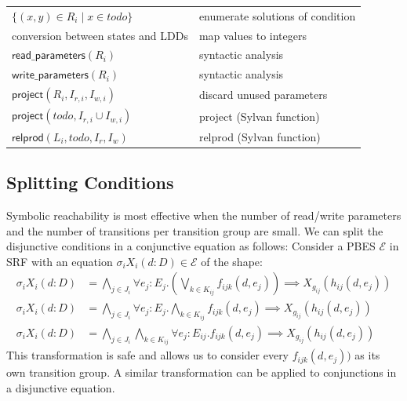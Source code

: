 \documentclass{article}
\newcommand{\var}[1]{\ensuremath{\textit{#1}}}
\begin{document}
\begin{center}
\label{table:pbes_ingredients}
\begin{tabular}{ |l|l| }
\hline
$\{ (x,y) \in R_i \mid x \in todo \}$ & enumerate solutions of condition \\
conversion between states and LDDs & map values to integers \\
$\textsf{read\_parameters}(R_i)$ & syntactic analysis \\
$\textsf{write\_parameters}(R_i)$ & syntactic analysis \\
$\textsf{project}(R_i, I_{r,i}, I_{w,i})$ & discard unused parameters \\
$\textsf{project}(\var{todo}, I_{r,i} \cup I_{w,i})$ & \textsf{project} (Sylvan function) \\
$\textsf{relprod}(L_i, \var{todo}, I_r, I_w)$ & \textsf{relprod} (Sylvan function) \\
\hline
\end{tabular}
\end{center}

\subsection{Splitting Conditions}

Symbolic reachability is most effective when the number of read/write parameters and the number of transitions per transition group are small.
We can split the disjunctive conditions in a conjunctive equation as follows:
Consider a PBES $\mathcal{E}$ in SRF with an equation $\sigma_i X_i(d:D) \in \mathcal{E}$ of the shape:
\begin{align*}
  \sigma_i X_i(d:D) &= \bigwedge\limits_{j \in J_i} \forall e_j : E_j . (\bigvee\limits_{k \in K_{ij}} f_{ijk}(d,e_j)) \implies X_{g_{ij}}(h_{ij}(d, e_j)) \\  
  \sigma_i X_i(d:D) &= \bigwedge\limits_{j \in J_i} \forall e_j : E_j . \bigwedge\limits_{k \in K_{ij}} f_{ijk}(d,e_j) \implies X_{g_{ij}}(h_{ij}(d, e_j)) \\
  \sigma_i X_i(d:D) &= \bigwedge\limits_{j \in J_i}\bigwedge\limits_{k \in K_{ij}} \forall e_j : E_{ij} .  f_{ijk}(d,e_j) \implies X_{g_{ij}}(h_{ij}(d, e_j))
\end{align*}
This transformation is safe and allows us to consider every $f_{ijk}(d,e_j))$ as its own transition group.
A similar transformation can be applied to conjunctions in a disjunctive equation.
\end{document}
